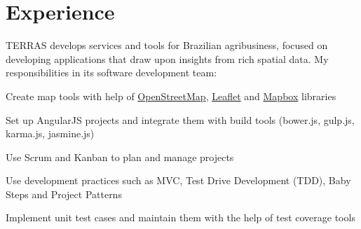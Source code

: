 \documentclass[]{joaosoares-resume}
\begin{document}
\begin{minipage}[t]{0.64\textwidth}

\section{Experience}

\sectionsep

{\justifying \noindent TERRAS develops services and tools for Brazilian agribusiness, focused on developing applications that draw upon insights from rich spatial data. My responsibilities in its software development team:\par} 

\sectionsep
\begin{tightemize}
\item Create map tools with help of \href{https://www.openstreetmap.org}{OpenStreetMap}, \href{http://leafletjs.com}{Leaflet} and \href{https://www.mapbox.com}{Mapbox} libraries 
\item Set up AngularJS projects and integrate them with build tools (bower.js, gulp.js, karma.js, jasmine.js)
\item Use Scrum and Kanban to plan and manage projects
\item Use development practices such as MVC, Test Drive Development (TDD), Baby Steps and Project Patterns
\item Implement unit test cases and maintain them with the help of test coverage tools
\end{tightemize}
\sectionsep



\end{minipage}
\end{document}

